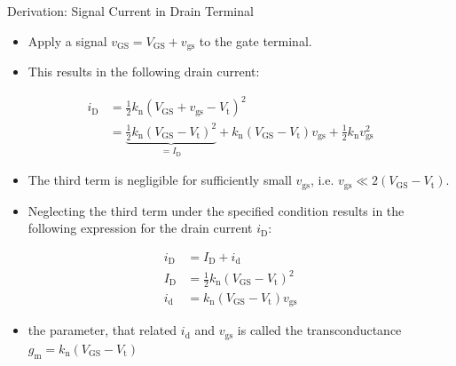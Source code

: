 \begin{frame}{Derivation: Signal Current in Drain Terminal}
    \begin{itemize}
        \item Apply a signal $v_{\mathrm{GS}}=V_{\mathrm{GS}}+v_{\mathrm{gs}}$ to the gate terminal.
        \item This results in the following drain current:
    \end{itemize}
    \begin{align*}
        i_{\mathrm{D}}&=\frac{1}{2}k_{\mathrm{n}}(V_{\mathrm{GS}}+v_{\mathrm{gs}}
        -V_{\mathrm{t}})^{2} \\
        &=\underbrace{ \frac{1}{2}k_{\mathrm{n}}(V_{\mathrm{GS}}-V_{\mathrm{t}})^{2} }_{ =I_{\mathrm{D}}}+
        k_{\mathrm{n}}(V_{\mathrm{GS}}-V_{\mathrm{t}})v_{\mathrm{gs}}
        +\frac{1}{2}k_{\mathrm{n}}v_{\mathrm{gs}}^{2}
    \end{align*}
    \begin{itemize}
        \item The third term is negligible for sufficiently small $v_{\mathrm{gs}}$, i.e. 
        $v_{\mathrm{gs}}\ll 2(V_{\mathrm{GS}}-V_{\mathrm{t}})$.
        \item Neglecting the third term under the specified condition results in the following 
        expression for the drain current $i_{\mathrm{D}}$:
    \end{itemize}
    \begin{align*}
    i_{\mathrm{D}}&=I_{\mathrm{D}}+i_{\mathrm{d}} \\
    I_{\mathrm{D}}&=\frac{1}{2}k_{\mathrm{n}}(V_{\mathrm{GS}}-V_{\mathrm{t}})^{2} \\
    i_{\mathrm{d}}&=k_{\mathrm{n}}(V_{\mathrm{GS}}-V_{\mathrm{t}})v_{\mathrm{gs}}
    \end{align*}
    \begin{itemize}
        \item the parameter, that related $i_{\mathrm{d}}$ and $v_{\mathrm{gs}}$ is called the 
        transconductance $g_{\mathrm{m}}=k_{\mathrm{n}}(V_{\mathrm{GS}}-V_{\mathrm{t}})$ 
    \end{itemize}
\end{frame}